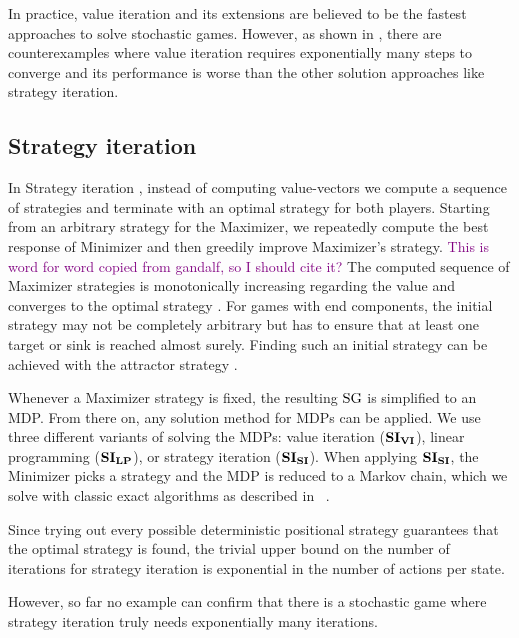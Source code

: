 In practice, value iteration and its extensions are believed to be the fastest approaches to solve stochastic games.
However, as shown in \cite{haddadmonmege}, there are counterexamples where value iteration requires exponentially many steps to converge and its performance is worse than the other solution approaches like strategy iteration.

\subsection{Strategy iteration}
In Strategy iteration \cite{HoffmanKarp}\cite{condonQP}, instead of computing value-vectors we compute a sequence of strategies and terminate with an optimal strategy for both players.
Starting from an arbitrary strategy for the Maximizer, we repeatedly compute the best response of Minimizer and then greedily improve Maximizer's strategy. 
\textcolor{purple}{This is word for word copied from gandalf, so I should cite it?}
The computed sequence of Maximizer strategies is monotonically increasing regarding the value and converges to the optimal strategy \cite[Theorem3]{correctnessSI}.
For games with end components, the initial strategy may not be completely arbitrary but has to ensure that at least one target or sink is reached almost surely.
Finding such an initial strategy can be achieved with the attractor strategy \cite[Section 5.3]{correctnessSI}.

Whenever a Maximizer strategy is fixed, the resulting $\textrm{SG}$ is simplified to an MDP. 
From there on, any solution method for MDPs can be applied.
We use three different variants of solving the MDPs: value iteration ($\mathbf{SI_{VI}}$), linear programming \cite{Puterman} ($\mathbf{SI_{LP}}$),
or strategy iteration ($\mathbf{SI_{SI}}$). When applying $\mathbf{SI_{SI}}$, the Minimizer picks a strategy and the MDP is reduced to a Markov chain, 
which we solve with classic exact algorithms as described in ~\cite[Chapter 11]{introProb}.

Since trying out every possible deterministic positional strategy guarantees that the optimal strategy is found,
the trivial upper bound on the number of iterations for strategy iteration is exponential in the number of actions per state.

However, so far no example can confirm that there is a stochastic game where strategy iteration truly needs exponentially many iterations.

